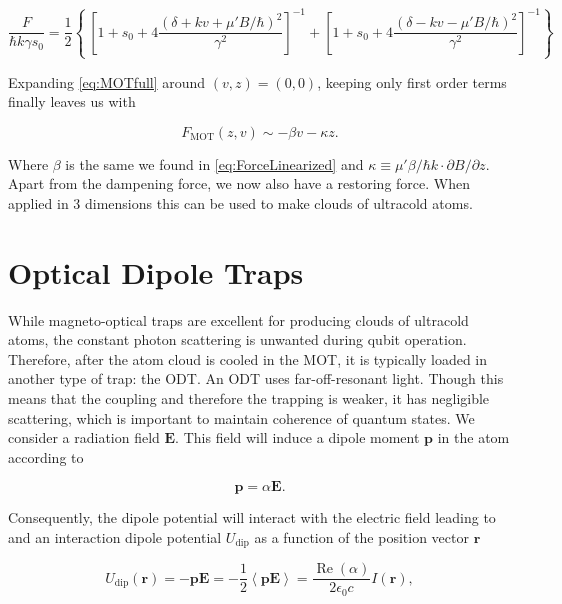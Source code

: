 \begin{equation}\label{eq:MOTfull}
	\frac{F}{\hbar k \gamma s_0} = \frac{1}{2}\left\{\
	\left[1 + s_0 + 4\frac{(\delta+kv+\mu'B/\hbar)^2}{\gamma^2}\right]^{-1}+
	\left[1 + s_0 + 4\frac{(\delta-kv-\mu'B/\hbar)^2}{\gamma^2}\right]^{-1}
	\right\}
\end{equation}

Expanding \cref{eq:MOTfull} around $(v,z) = (0,0)$, keeping only first order terms finally leaves us with \cite{Kowalski2010}

\begin{equation}\label{eq:ForceMOT}
	F_{\text{MOT}}(z,v) \sim -\beta v - \kappa z.
\end{equation}

Where $\beta$ is the same we found in \cref{eq:ForceLinearized} and $\kappa \equiv \mu' \beta /\hbar k \cdot \partial B/\partial z$. Apart from the dampening force, we now also have a restoring force. When applied in 3 dimensions this can be used to make clouds of ultracold atoms. 

\section{Optical Dipole Traps}\label{sec:OpticalDipoleTrap}

While magneto-optical traps are excellent for producing clouds of ultracold atoms, the constant photon scattering is unwanted during qubit operation. Therefore, after the atom cloud is cooled in the \ac{MOT}, it is typically loaded in another type of trap: the \ac{ODT}. An ODT uses far-off-resonant light. Though this means that the coupling and therefore the trapping is weaker, it has negligible scattering, which is important to maintain coherence of quantum states. We consider a radiation field $\mathbf{E}$. This field will induce a dipole moment $\mathbf{p}$ in the atom according to 
	
\begin{equation}\label{eq:DipoleMoment}
	\mathbf{p} = \alpha \mathbf{E}.
\end{equation}

Consequently, the dipole potential will interact with the electric field leading to and an interaction dipole potential $U_{\text{dip}}$ as a function of the position vector $\mathbf{r}$ \cite{Grimm2000}

\begin{equation}\label{eq:DipolePotential}
	U_{\text{dip}}(\mathbf{r}) = -\mathbf{p}\mathbf{E} = 
	-\frac{1}{2} \left\langle \mathbf{p}\mathbf{E} \right\rangle = \frac{\operatorname{Re}(\alpha)}{2\epsilon_0 c} I(\mathbf{r}),
\end{equation}

